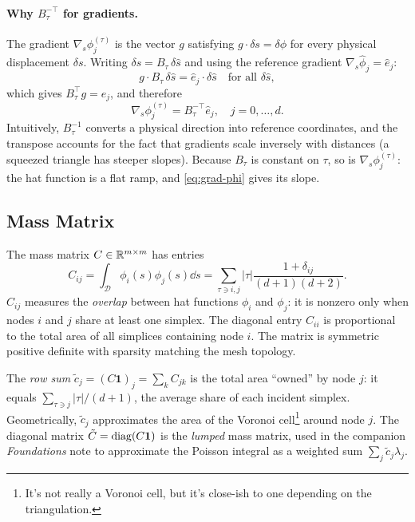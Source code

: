 \documentclass[11pt]{article}
\begin{document}
\paragraph{Why $B_\tau^{-\top}$ for gradients.}
The gradient $\nabla_s\phi_j^{(\tau)}$ is the vector $g$ satisfying
$g\cdot\delta s = \delta\phi$ for every physical displacement $\delta s$.
Writing $\delta s = B_\tau\,\delta\hat s$ and using the reference gradient
$\nabla_{\hat s}\hat\phi_j = \hat{e}_j$:
\[
  g \cdot B_\tau\,\delta\hat s
  = \hat{e}_j \cdot \delta\hat s
  \quad\text{for all }\delta\hat s,
\]
which gives $B_\tau^{\top}g = \hat{e}_j$, and therefore
\begin{equation}
  \nabla_s \phi_j^{(\tau)} = B_\tau^{-\top}\hat{e}_j, \quad j = 0, \ldots, d.
  \label{eq:grad-phi}
\end{equation}
Intuitively, $B_\tau^{-1}$ converts a physical direction into reference
coordinates, and the transpose accounts for the fact that gradients scale
inversely with distances (a squeezed triangle has steeper slopes).  Because
$B_\tau$ is constant on $\tau$, so is $\nabla_s\phi_j^{(\tau)}$: the hat
function is a flat ramp, and \eqref{eq:grad-phi} gives its slope.

\subsection{Mass Matrix}
\label{sec:mass}

The mass matrix $C \in \mathbb{R}^{m\times m}$ has entries
\begin{equation}
  C_{ij} = \int_\mathcal{D} \phi_i(s)\phi_j(s) \dd s
         = \sum_{\tau \ni i,j} |\tau| \frac{1 + \delta_{ij}}{(d+1)(d+2)}.
  \label{eq:mass}
\end{equation}
$C_{ij}$ measures the \emph{overlap} between hat functions $\phi_i$ and
$\phi_j$: it is nonzero only when nodes $i$ and $j$ share at least one
simplex.  The diagonal entry $C_{ii}$ is proportional to the total area of
all simplices containing node $i$.  The matrix is symmetric positive definite
with sparsity matching the mesh topology.

The \emph{row sum} $\tilde{c}_j = (C\mathbf{1})_j = \sum_k C_{jk}$ is the
total area ``owned'' by node $j$: it equals $\sum_{\tau\ni j}|\tau|/(d+1)$,
the average share of each incident simplex.  Geometrically, $\tilde{c}_j$
approximates the area of the Voronoi cell\footnote{It's not really a Voronoi cell, but it's close-ish to one depending on the triangulation.} around node $j$.  The diagonal
matrix $\tilde{C} = \operatorname{diag}(C\mathbf{1})$ is the \emph{lumped} mass matrix,
used in the companion \emph{Foundations} note to approximate the Poisson integral
as a weighted sum $\sum_j \tilde{c}_j \lambda_j$.
\end{document}
